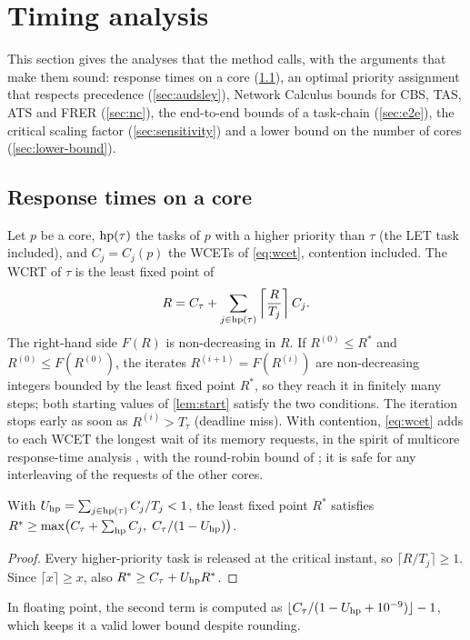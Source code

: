 \section{Timing analysis}
\label{sec:analysis}

\begin{inbrief}
This section gives the analyses that the method calls, with the arguments
that make them sound: response times on a core (\cref{sec:rta}), an
optimal priority assignment that respects precedence (\cref{sec:audsley}),
Network Calculus bounds for CBS, TAS, ATS and FRER (\cref{sec:nc}), the
end-to-end bounds of a task-chain (\cref{sec:e2e}), the critical scaling
factor (\cref{sec:sensitivity}) and a lower bound on the number of cores
(\cref{sec:lower-bound}).
\end{inbrief}

\subsection{Response times on a core}
\label{sec:rta}

Let $p$ be a core, $\mathrm{hp}(\tau)$ the tasks of $p$ with a higher priority
than $\tau$ (the LET task included), and $C_j=C_j(p)$ the WCETs of
\cref{eq:wcet}, contention included. The WCRT of $\tau$ is the least fixed
point of \cite{joseph1986finding,audsley1993applying}
\begin{equation}
R=C_\tau+\sum_{j\in\mathrm{hp}(\tau)}\left\lceil \frac{R}{T_j} \right\rceil C_j .
\label{eq:rta}
\end{equation}
The right-hand side $F(R)$ is non-decreasing in $R$. If $R^{(0)}\le R^\ast$
and $R^{(0)}\le F(R^{(0)})$, the iterates $R^{(i+1)}=F(R^{(i)})$ are
non-decreasing integers bounded by the least fixed point $R^\ast$, so they
reach it in finitely many steps; both starting values of \cref{lem:start}
satisfy the two conditions. The iteration stops early as soon as
$R^{(i)}>T_\tau$ (deadline miss). With contention, \cref{eq:wcet} adds to
each WCET the longest wait of its memory requests, in the spirit of
multicore response-time analysis \cite{davis2018extensible}, with the
round-robin bound of \cite{paolieri2009hardware}; it is safe for any interleaving of the
requests of the other cores.

\begin{lemma}
\label{lem:start}
With $U_{\mathrm{hp}}=\sum_{j\in\mathrm{hp}(\tau)}C_j/T_j<1$, the least fixed point $R^\ast$
satisfies $R^\ast\ge\max\bigl(C_\tau+\sum_{\mathrm{hp}}C_j,\;C_\tau/(1-U_{\mathrm{hp}})\bigr)$.
\end{lemma}
\begin{proof}
Every higher-priority task is released at the critical instant, so
$\lceil R/T_j\rceil\ge1$. Since $\lceil x\rceil\ge x$, also $R^\ast\ge
C_\tau+U_{\mathrm{hp}}R^\ast$.
\end{proof}
In floating point, the second term is computed as $\lfloor C_\tau/(1-
U_{\mathrm{hp}}+10^{-9})\rfloor-1$, which keeps it a valid lower bound despite
rounding.

